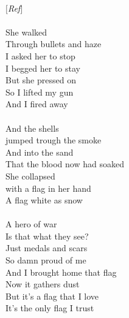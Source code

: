 {\\
\emph{\ensuremath{[}Ref\ensuremath{]}}\\
\\
She walked\\
Through bullets and haze\\
I asked her to stop\\
I begged her to stay\\
But she pressed on\\
So I lifted my gun\\
And I fired away\\
\\
And the shells\\
jumped trough the smoke\\
And into the sand\\
That the blood now had soaked\\
She collapsed\\
with a flag in her hand\\
A flag white as snow\\
\\
A hero of war\\
Is that what they see?\\
Just medals and scars\\
So damn proud of me\\
And I brought home that flag\\
Now it gathers dust\\
But it's a flag that I love\\
It's the only flag I trust
}




